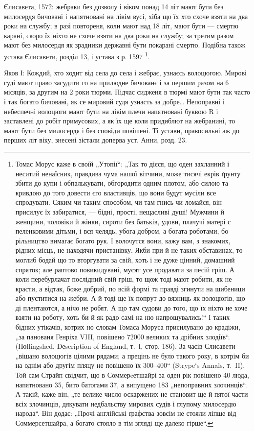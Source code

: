 Єлисавета, 1572: жебраки без дозволу і віком понад 14 літ мают бути без
милосердя бичовані і напятновані на лівім вусі, хіба що їх хто схоче взяти на
два роки на службу; в разі повтореня, коли мают над 18 літ, мают бути — смертю
карані, скоро їх ніхто не схоче взяти на два роки на службу; за третим разом
мают без милосердя як зрадники державні бути покарані смертю. Подібна також 
устава Єлисавети, розділ 13, і устава з р. 1597 \footnote{
Томас Морус каже в своїй „Утопії“: „Так то дієся, що оден захланний і неситий
ненаїсник, правдива чума нашої вітчини, може тисячі екрів ґрунту збити до купи
і обпалькувати, обгородити одним плотом, або силою та кривдою до того довести
єго властивців, що вони будут мусіли все спродувати. Сяким чи таким способом,
чи там гнись чи ломайся, він присилує їх забиратися, — бідні, прості, нещасливі
душі! Мужчини й женщини, чоловіки й жінки, сироти без батьків, удови, плачучі
матері с пеленковими дітьми, і вся челядь, убога добром, а богата
роботами, бо рільництво вимагає богато рук. І волочутся вони, кажу вам,
з знакомих, рідних місць, не находячи пристанівку. Якби при й не таких
обставинах, то моглиб бодай що то вторгувати за свій, хоть і не дуже
цінний, домашний спряток; але раптово повикидувані, мусят усе продавати
за песій гріш. А коли перебурлачат послідний свій гріш, то щож
тоді мают робити, як не красти, а відтак, боже добрий, по всій формі та
правді згинути на шибеници або пуститися на жебри. А й тоді ще їх
попрут до вязниць як волоцюгів, що-ді плентаются, а нічо не робят.
А що там судови до того, що їх ніхто не хоче взяти на роботу, хоть би
й як радо самі на ню напрошувались!“ І таких бідних утікачів, котрих
но словам Томаса Моруса присилувано до крадіжи, „за панованя Генріха
VIII, повішено \num{72000} великих та дрібних злодіїв“. (Ноllingshed, Dеscription
of England, т.~І, стор. 186). За часів Єлисавети „вішано волоцюгів
цілими рядами; а прецінь не було такого року, в котрім би на
однім або другім пляцу не повішено їх 300--400“ (Strype`s Annals, т.~II),
Той сам Страйп свідчит, що в Соммерcетшайрі за оден рік повішено 40
люда, напятновано 35, бито батогами 37, а випущено 183 „непоправних
злочинців“. А такій, каже він, „те велике число оскаржених не становит
ще й пятої части всіх злочинців, дякувати недбальству мирових судів
і глупому милосердю народа“. Він додає: „Прочі англійські ґрафства
зовсім не стояли ліпше від Соммерсетшайра, а богато стояло в тім згляді
ще далеко гірше“.
}.

Яков І: Кождий, хто ходит від села до села і жебрає,
узнаєсь волоцюгою. Мирові суді мают право засудити го на
прилюдне бичованє і за першим разом на 6 місяців, за
другим на 2 роки тюрми. Підчас сидженя в тюрмі мают
бути так часто і так богато бичовані, як се мировий судя
узнасть за добре\dots{} Непоправні і небеспечні волоцюги мают
бути на лівім плечи напятновані буквою R і заставлені до
робіт примусових, а як їх ще коли придиблют на жебранині,
то мают бути без милосердя і без сповіди повішені. Ті устави,
правосильні аж до перших літ  віку,
знесені зістали доперва  уст. Анни, розд. 23.

